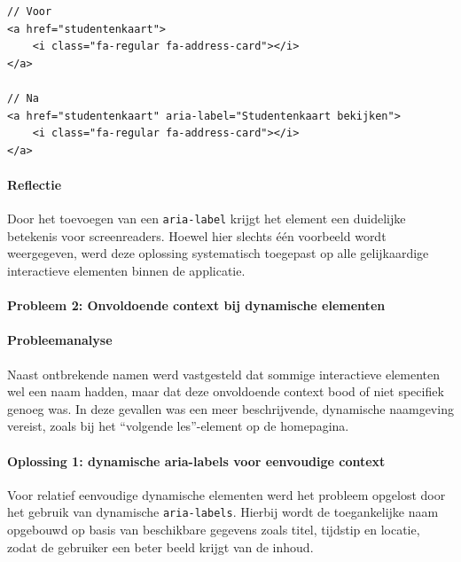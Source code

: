 \begin{listing}[H]
\begin{verbatim}
// Voor
<a href="studentenkaart">
	<i class="fa-regular fa-address-card"></i>
</a>

// Na
<a href="studentenkaart" aria-label="Studentenkaart bekijken">
	<i class="fa-regular fa-address-card"></i>
</a>
\end{verbatim}
\caption{Toevoegen van een toegankelijke naam via \texttt{aria-label}.}
\label{lst:aria-label}
\end{listing}

\paragraph{Reflectie}

Door het toevoegen van een \texttt{aria-label} krijgt het element een duidelijke betekenis voor screenreaders. 
Hoewel hier slechts één voorbeeld wordt weergegeven, werd deze oplossing systematisch toegepast op alle gelijkaardige interactieve elementen binnen de applicatie.

\paragraph{Probleem 2: Onvoldoende context bij dynamische elementen}

\paragraph{Probleemanalyse}

Naast ontbrekende namen werd vastgesteld dat sommige interactieve elementen wel een naam hadden, maar dat deze onvoldoende context bood of niet specifiek genoeg was. In deze gevallen was een meer beschrijvende, dynamische naamgeving vereist, zoals bij het “volgende les”-element op de homepagina.

\paragraph{Oplossing 1: dynamische aria-labels voor eenvoudige context}

Voor relatief eenvoudige dynamische elementen werd het probleem opgelost door het gebruik van dynamische \texttt{aria-labels}. Hierbij wordt de toegankelijke naam opgebouwd op basis van beschikbare gegevens zoals titel, tijdstip en locatie, zodat de gebruiker een beter beeld krijgt van de inhoud.

